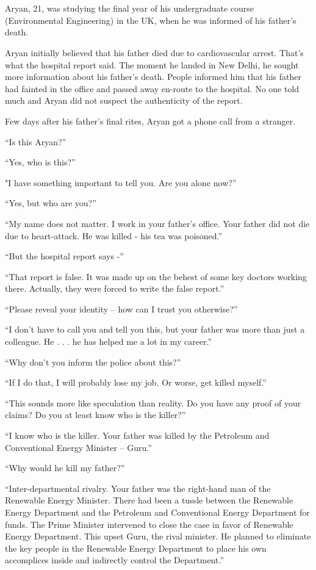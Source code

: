 \chapter{}

Aryan, 21, was studying the final year of his undergraduate course
(Environmental Engineering) in the UK, when he was informed of his father's
death.

Aryan initially believed that his father died due to cardiovascular arrest.
That's what the hospital report said. The moment he landed in New Delhi, he
sought more information about his father's death. People informed him that his
father had fainted in the office and passed away en-route to the hospital. No
one told much and Aryan did not suspect the authenticity of the report.

Few days after his father's final rites, Aryan got a phone call from a stranger.

“Is this Aryan?”

“Yes, who is this?”

"I have something important to tell you. Are you alone now?”

“Yes, but who are you?”

“My name does not matter. I work in your father's office. Your father did not
die due to heart-attack. He was killed - his tea was poisoned.”

“But the hospital report says -”

“That report is false. It was made up on the behest of some key doctors working
there. Actually, they were forced to write the false report.”

“Please reveal your identity – how can I trust you otherwise?”

“I don't have to call you and tell you this, but your father was more than just
a colleague. He . . . he has helped me a lot in my career.”

“Why don't you inform the police about this?”

“If I do that, I will probably lose my job. Or worse, get killed myself.”

“This sounds more like speculation than reality. Do you have any proof of your
claims? Do you at least know who is the killer?”

“I know who is the killer. Your father was killed by the Petroleum and
Conventional Energy Minister – Guru.”

“Why would he kill my father?”

“Inter-departmental rivalry. Your father was the right-hand man of the Renewable
Energy Minister. There had been a tussle between the Renewable Energy Department
and the Petroleum and Conventional Energy Department for funds. The Prime Minister
intervened to close the case in favor of Renewable Energy Department. This upset
Guru, the rival minister. He planned to eliminate the key people in the
Renewable Energy Department to place his own accomplices inside and indirectly
control the Department.”

